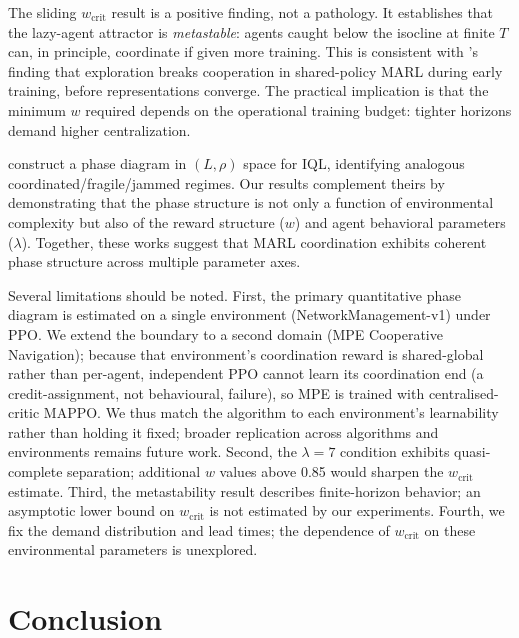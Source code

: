 \documentclass[11pt]{article}
\newcommand{\wcrit}{w_{\mathrm{crit}}}
\begin{document}
The sliding $\wcrit$ result is a positive finding, not a pathology.
It establishes that the lazy-agent attractor is \emph{metastable}: agents
caught below the isocline at finite $T$ can, in principle, coordinate if
given more training.
This is consistent with \citet{weng2026}'s finding that exploration breaks
cooperation in shared-policy MARL during early training, before
representations converge.
The practical implication is that the minimum $w$ required depends on the
operational training budget: tighter horizons demand higher centralization.

\citet{yamaguchi2025} construct a phase diagram in $(L, \rho)$ space for
IQL, identifying analogous coordinated/fragile/jammed regimes.
Our results complement theirs by demonstrating that the phase structure is
not only a function of environmental complexity but also of the reward
structure ($w$) and agent behavioral parameters ($\lambda$).
Together, these works suggest that MARL coordination exhibits coherent
phase structure across multiple parameter axes.

Several limitations should be noted.
First, the primary quantitative phase diagram is estimated on a single
environment (NetworkManagement-v1) under PPO. We extend the boundary to a second
domain (MPE Cooperative Navigation); because that environment's coordination
reward is shared-global rather than per-agent, independent PPO cannot learn its
coordination end (a credit-assignment, not behavioural, failure), so MPE is
trained with centralised-critic MAPPO. We thus match the algorithm to each
environment's learnability rather than holding it fixed; broader replication
across algorithms and environments remains future work.
Second, the $\lambda{=}7$ condition exhibits quasi-complete separation;
additional $w$ values above 0.85 would sharpen the $\wcrit$ estimate.
Third, the metastability result describes finite-horizon behavior; an
asymptotic lower bound on $\wcrit$ is not estimated by our experiments.
Fourth, we fix the demand distribution and lead times; the dependence of
$\wcrit$ on these environmental parameters is unexplored.

\section{Conclusion}
\label{sec:conclusion}
\end{document}
